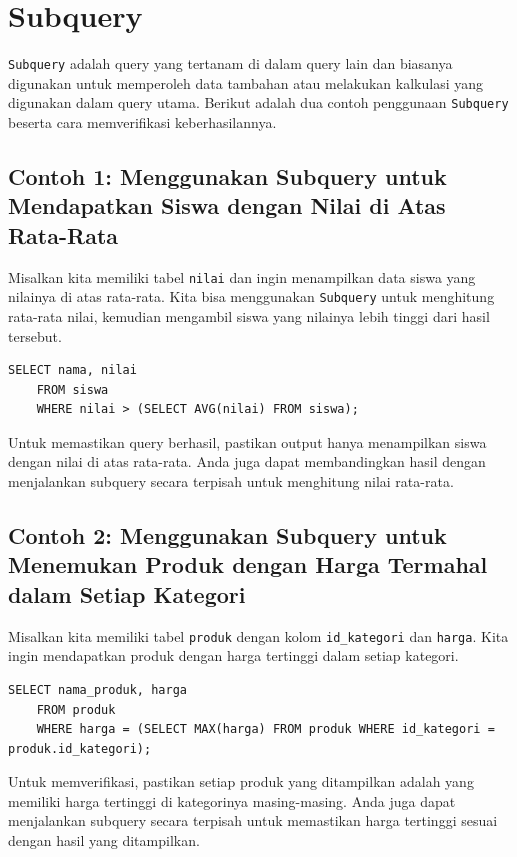 \section{Subquery}

\texttt{Subquery} adalah query yang tertanam di dalam query lain dan biasanya digunakan untuk memperoleh data tambahan atau melakukan kalkulasi yang digunakan dalam query utama. Berikut adalah dua contoh penggunaan \texttt{Subquery} beserta cara memverifikasi keberhasilannya.

\subsection*{Contoh 1: Menggunakan Subquery untuk Mendapatkan Siswa dengan Nilai di Atas Rata-Rata}
Misalkan kita memiliki tabel \texttt{nilai} dan ingin menampilkan data siswa yang nilainya di atas rata-rata. Kita bisa menggunakan \texttt{Subquery} untuk menghitung rata-rata nilai, kemudian mengambil siswa yang nilainya lebih tinggi dari hasil tersebut.

\begin{lstlisting}[style=sql]
	SELECT nama, nilai
	FROM siswa
	WHERE nilai > (SELECT AVG(nilai) FROM siswa);
\end{lstlisting}

Untuk memastikan query berhasil, pastikan output hanya menampilkan siswa dengan nilai di atas rata-rata. Anda juga dapat membandingkan hasil dengan menjalankan subquery secara terpisah untuk menghitung nilai rata-rata.

\subsection*{Contoh 2: Menggunakan Subquery untuk Menemukan Produk dengan Harga Termahal dalam Setiap Kategori}
Misalkan kita memiliki tabel \texttt{produk} dengan kolom \texttt{id\_kategori} dan \texttt{harga}. Kita ingin mendapatkan produk dengan harga tertinggi dalam setiap kategori.

\begin{lstlisting}[style=sql]
	SELECT nama_produk, harga
	FROM produk
	WHERE harga = (SELECT MAX(harga) FROM produk WHERE id_kategori = produk.id_kategori);
\end{lstlisting}

Untuk memverifikasi, pastikan setiap produk yang ditampilkan adalah yang memiliki harga tertinggi di kategorinya masing-masing. Anda juga dapat menjalankan subquery secara terpisah untuk memastikan harga tertinggi sesuai dengan hasil yang ditampilkan.


